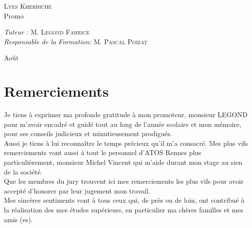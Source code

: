 \documentclass[12pt, a4paper, openany]{report}
\begin{document}
\begin{titlepage}
\begin{sffamily}
\begin{center}
    \begin{minipage}{0.4\textwidth}
      \begin{flushleft} \large
         \textsc{Lyes Kherbiche}\\
        Promo \\
      \end{flushleft}
    \end{minipage}
    \begin{minipage}{0.4\textwidth}
      \begin{flushright} \large
        \emph{Tuteur :}  \textsc{M. Legond Fabrice}\\
        \emph{Responsable de la Formation:} \textsc{M. Pascal Poizat}
      \end{flushright}
    \end{minipage}

    \vfill

    {\large Août}

  \end{center}
  \end{sffamily}      
      
      
      
        
  \end{titlepage}
\makeatother



\chapter*{Remerciements}

  Je tiens à exprimer ma profonde gratitude à mon promoteur, monsieur LEGOND pour m'avoir encadré et guidé tout au long de l'année scolaire et mon mémoire, pour ses conseils judicieux et minutieusement prodigués.\\
  
  Aussi je tiens à lui reconnaître le temps précieux qu’il m'a consacré. Mes plus vifs remerciements vont aussi à tout le personnel d'ATOS Rennes plus particulièrement, monsieur Michel Vincent qui m’aide durant mon stage au sien de la société. \\
  
   Que les membres du jury trouvent ici mes remerciements les plus vifs pour avoir accepté d’honorer par leur jugement mon travail.\\
   
   Mes sincères sentiments vont à tous ceux qui, de près ou de loin, ont contribué à la réalisation des mes études supérieurs, en particulier ma chères familles et mes amis (es).\\
   
\end{document}
